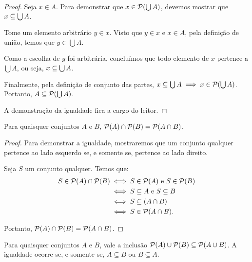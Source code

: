 \begin{proof}
    Seja \(x \in A\). Para demonstrar que \(x \in \mathcal{P}(\bigcup A)\), devemos mostrar que \(x \subseteq \bigcup A\).

    Tome um elemento arbitrário \(y \in x\). Visto que \(y \in x\) e \(x \in A\), pela definição de união, temos que \(y \in \bigcup A\).

    Como a escolha de \(y\) foi arbitrária, concluímos que todo elemento de \(x\) pertence a \(\bigcup A\), ou seja, \(x \subseteq \bigcup A\).

    Finalmente, pela definição de conjunto das partes, \(x \subseteq \bigcup A \implies x \in \mathcal{P}(\bigcup A)\). Portanto, \(A \subseteq \mathcal{P}(\bigcup A)\).

    A demonstração da igualdade fica a cargo do leitor.
\end{proof}

\begin{proposicao}
    \label{prop:intersecao_partes}
    Para quaisquer conjuntos \(A\) e \(B\), \(\mathcal{P}(A) \cap \mathcal{P}(B) = \mathcal{P}(A \cap B)\).
\end{proposicao}

\begin{proof}
    Para demonstrar a igualdade, mostraremos que um conjunto qualquer pertence ao lado esquerdo se, e somente se, pertence ao lado direito.

    Seja \(S\) um conjunto qualquer. Temos que:
    \begin{align*}
        S \in \mathcal{P}(A) \cap \mathcal{P}(B) & \iff S \in \mathcal{P}(A) \text{ e } S \in \mathcal{P}(B) \\
                                 & \iff S \subseteq A \text{ e } S \subseteq B         \\
                                 & \iff S \subseteq (A \cap B)                    \\
                                 & \iff S \in \mathcal{P}(A \cap B).
    \end{align*}

    Portanto, \(\mathcal{P}(A) \cap \mathcal{P}(B) = \mathcal{P}(A \cap B)\).
\end{proof}

\begin{proposicao}
    \label{prop:uniao_partes_inclusao}
    Para quaisquer conjuntos \(A\) e \(B\), vale a inclusão \(\mathcal{P}(A) \cup \mathcal{P}(B) \subseteq \mathcal{P}(A \cup B)\). A igualdade ocorre se, e somente se, \(A \subseteq B\) ou \(B \subseteq A\).
\end{proposicao}

